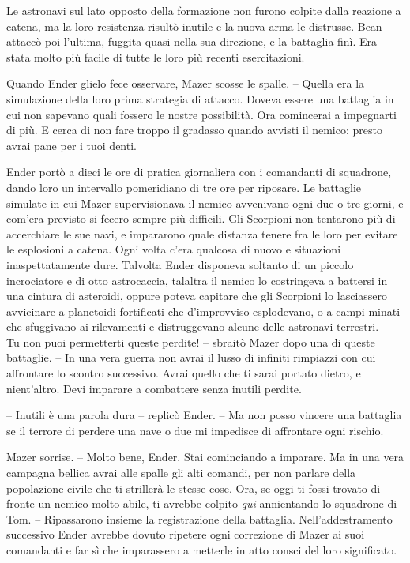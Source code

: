 {Le astronavi sul lato opposto della formazione non furono colpite dalla
	reazione a catena, ma la loro resistenza risultò inutile e la nuova arma
	le distrusse. Bean attaccò poi l'ultima, fuggita quasi nella sua
	direzione, e la battaglia finì. Era stata molto più facile di tutte le
	loro più recenti esercitazioni.}

{Quando Ender glielo fece osservare, Mazer scosse le spalle. -- Quella
	era la simulazione della loro prima strategia di attacco. Doveva essere
	una battaglia in cui non sapevano quali fossero le nostre possibilità.
	Ora comincerai a impegnarti di più. E cerca di non fare troppo il
	gradasso quando avvisti il nemico: presto avrai pane per i tuoi denti.}

{Ender portò a dieci le ore di pratica giornaliera con i comandanti di
	squadrone, dando loro un intervallo pomeridiano di tre ore per riposare.
	Le battaglie simulate in cui Mazer supervisionava il nemico avvenivano
	ogni due o tre giorni, e com'era previsto si fecero sempre più
	difficili. Gli Scorpioni non tentarono più di accerchiare le sue navi, e
	impararono quale distanza tenere fra le loro per evitare le esplosioni a
	catena. Ogni volta c'era qualcosa di nuovo e situazioni inaspettatamente
	dure. Talvolta Ender disponeva soltanto di un piccolo incrociatore e di
	otto astrocaccia, talaltra il nemico lo costringeva a battersi in una
	cintura di asteroidi, oppure poteva capitare che gli Scorpioni lo
	lasciassero avvicinare a planetoidi fortificati che d'improvviso
	esplodevano, o a campi minati che sfuggivano ai rilevamenti e
	distruggevano alcune delle astronavi terrestri. -- Tu non puoi
	permetterti queste perdite! -- sbraitò Mazer dopo una di queste
	battaglie. -- In una vera guerra non avrai il lusso di infiniti
	rimpiazzi con cui affrontare lo scontro successivo. Avrai quello che ti
	sarai portato dietro, e nient'altro. Devi imparare a combattere senza
	inutili perdite.}

{-- Inutili è una parola dura -- replicò Ender. -- Ma non posso vincere
	una battaglia se il terrore di perdere una nave o due mi impedisce di
	affrontare ogni rischio.}

{Mazer sorrise. -- Molto bene, Ender. Stai cominciando a imparare. Ma in
	una vera campagna bellica avrai alle spalle gli alti comandi, per non
	parlare della popolazione civile che ti strillerà le stesse cose. Ora,
	se oggi ti fossi trovato di fronte un nemico molto abile, ti avrebbe
	colpito \emph{qui} annientando lo squadrone di Tom. -- Ripassarono
	insieme la registrazione della battaglia. Nell'addestramento successivo
	Ender avrebbe dovuto ripetere ogni correzione di Mazer ai suoi
	comandanti e far sì che imparassero a metterle in atto consci del loro
	significato.}

